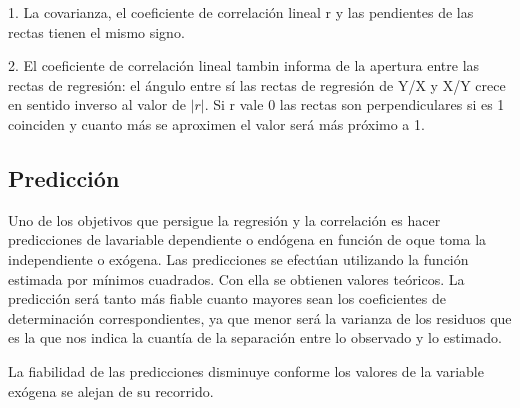\documentclass{article}
\begin{document}
1. La covarianza, el coeficiente de correlación lineal r y las pendientes de las rectas tienen el mismo signo.


2. El coeficiente de correlación lineal tambin informa de la apertura entre las rectas de regresión: el ángulo entre sí las rectas de regresión de Y/X y X/Y crece en sentido inverso al valor de $ |r| $. Si r vale 0 las rectas son perpendiculares si es 1 coinciden y cuanto más se aproximen el valor será más próximo a 1.

\subsection{Predicción}

Uno de los objetivos que persigue la regresión y la correlación es hacer predicciones de lavariable dependiente o endógena en función de oque toma la independiente o exógena. Las predicciones se efectúan utilizando la función estimada por mínimos cuadrados. Con ella se obtienen valores teóricos. La predicción será tanto más fiable cuanto mayores sean los coeficientes de determinación correspondientes, ya que menor será la varianza de los residuos que es la que nos indica la cuantía de la separación entre lo observado y lo estimado.

La fiabilidad de las predicciones disminuye conforme los valores de la variable exógena se alejan de su recorrido.

 
\end{document}
